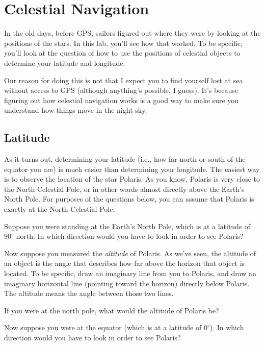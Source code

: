 \chapter{Celestial Navigation}

In the old days, before GPS, sailors figured out where they were
by looking at the positions of the stars. In this lab, you'll
see how that worked. To be specific, you'll look at the question
of how to use the positions of celestial 
objects to determine your latitude and longitude.

Our reason for doing this is not that I expect you to find yourself
lost at sea without access to GPS (although anything's possible,
I guess). It's because
figuring out how celestial navigation works is a good way to make
sure you understand how things move in the night sky.

\section*{Latitude}

As it turns out, determining your latitude (i.e., how far north or
south of the equator you are) is much easier than determining your longitude.
The easiest way is to observe the location of the star Polaris.
As you know, Polaris is very close to the North Celestial Pole, or in
other words almost directly above the Earth's North Pole. For
purposes of the questions below, you can assume that Polaris is
exactly at the North Celestial Pole.

Suppose you were standing at the Earth's North Pole, which is at a latitude
of $90^\circ$ north. In which direction would you have to look
in order to see Polaris?

\vskip 1in

Now suppose you measured the \textit{altitude} of Polaris. 
As we've seen, the 
altitude of an object is the angle that describes how far above
the horizon that object is located. To be specific, draw an imaginary
line from you to Polaris, and draw an imaginary horizontal line (pointing
toward the horizon) directly below Polaris. The altitude means
the angle between those two lines.

If you were at the north pole, what would the altitude of Polaris be?

\vskip 1in

Now suppose you were at the equator (which is at a latitude
of $0^\circ$). In which direction would you have to look in order to see
Polaris?

